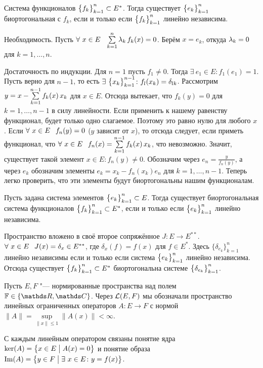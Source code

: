 \begin{The}
  Система функционалов $\ar fk1n\subset E^*$. Тогда существует $\ar ek1n$ биортогональная с $f_k$, если и только если $\ar fk1n$ линейно независима.
\end{The}
\begin{Proof}
 Необходимость. Пусть $\forall\ x\in E\pau  \RY k1n\l_k\,f_k(x)=0$. Берём $x = e_k$, откуда $\l_k=0$ для $k=1,\dots,n$.

Достаточность по индукции. Для $n=1$ пусть $f_1\ne 0$. Тогда $\exists\ e_1\in E\colon f_1(e_1)=1$. Пусть верно для $n-1$, то есть $\exists\ \ar xk1{n-1}\colon f_l(x_k) = \delta_{lk}$. Рассмотрим $y = x - \RY k1{n-1} f_k(x)\,x_k$ для $x\in E$. Отсюда вытекает, что $f_k(y)=0$ для $k=1,\dots,n-1$ в силу линейности. Если применить к нашему равенству функционал, будет только одно слагаемое. Поэтому это равно нулю для любого $x$.
Если  $\forall\ x\in E\pau f_n(y)=0$ ($y$ зависит от $x$), то отсюда следует, если приметь функционал, что $\forall\ x\in E\pau f_n(x) =\RY k1{n-1}f_k(x)\,x_k$, что невозможно. Значит, существует такой элемент $x\in E\colon f_n(y)\ne0$. Обозначим через $e_n=\frac{y}{f_n(y)}$, а через $e_k$ обозначим элементы $e_k = x_k - f_n(x_k)e_n$ для $k=1,\dots,n-1$. Теперь легко проверить, что эти элементы будут биортогональны нашим функционалам.
\end{Proof}
\begin{Sl}
Пусть задана система элементов $\ar ek1n\subset E$. Тогда существует биортогональная система функционалов $\ar fk1n\subset E^*$, если и только если $\ar ek1n$ линейно независима.
\end{Sl}
\begin{Proof}
Пространство вложено в своё второе сопряжённое $J\colon E\to E^{**}$. $\forall\ x\in E\pau J(x) = \delta_x\in E^{**}$, где $\delta_x(f) = f(x)$ для $f\in E^*$. Здесь $\big\{\delta_{e_k}\big\}_{k=1}^n$ линейно независимы если и только если система $\ar ek1n$ линейно независима. Отсюда существует $\ar fk1n\subset E^*$ биортогональна системе $\big\{\d_{e_k}\big\}_{k=1}^n$.
\end{Proof}

Пусть $E,F$ "--- нормированные пространства над полем $\F\in\{\R,\C\}$. Через $\L(E,F)$ мы обозначали пространство линейных ограниченных операторов $A\colon E\to F$ с нормой $\|A\| = \sup\limits_{\|x\|\le1}\big\|A(x)\big\|<\infty$.

С каждым линейным оператором связаны понятие ядра $\ker(A) = \big\{x\in E\bigm |A(x)=0\big\}$ и понятие образа $\Im(A) = \big\{y\in F\bigm|\exists\ x\in E\colon y=f(x)\big\}$.

